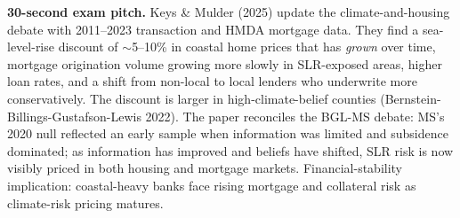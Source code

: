 \documentclass[11pt]{article}
\begin{document}
\begin{keybox}
\textbf{30-second exam pitch.} Keys \& Mulder (2025) update the climate-and-housing debate with 2011--2023 transaction and HMDA mortgage data. They find a sea-level-rise discount of $\sim$5--10\% in coastal home prices that has \emph{grown} over time, mortgage origination volume growing more slowly in SLR-exposed areas, higher loan rates, and a shift from non-local to local lenders who underwrite more conservatively. The discount is larger in high-climate-belief counties (Bernstein-Billings-Gustafson-Lewis 2022). The paper reconciles the BGL-MS debate: MS's 2020 null reflected an early sample when information was limited and subsidence dominated; as information has improved and beliefs have shifted, SLR risk is now visibly priced in both housing and mortgage markets. Financial-stability implication: coastal-heavy banks face rising mortgage and collateral risk as climate-risk pricing matures.
\end{keybox}
\end{document}

